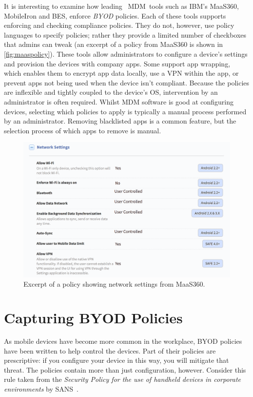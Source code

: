 \documentclass{llncs}
\begin{document}
It is interesting to examine how leading~\cite{rob_smith_magic_2016} MDM~tools such as IBM's MaaS360, MobileIron and \ac{BES}, enforce \emph{BYOD} policies.
Each of these tools supports enforcing and checking compliance policies. 
They do not, however, use policy languages to specify policies; rather they provide a limited number of checkboxes that admins can tweak (an excerpt of a policy from MaaS360 is shown in \autoref{fig:maaspolicy}).
These tools allow administrators to configure a device's settings and provision the devices with company apps.
Some support app wrapping, which enables them to encrypt app data locally, use a VPN within the app, or prevent apps not being used when the device isn't compliant.
Because the policies are inflexible and tightly coupled to the device's OS, intervention by an administrator is often required.
Whilst MDM software is good at configuring devices, selecting which policies to apply is typically a manual process performed by an administrator.
Removing blacklisted apps is a common feature, but the selection process of which apps to remove is manual.

\begin{figure}
  \includegraphics[width=\linewidth]{figures/maas360-policy.png}
  \caption{Excerpt of a policy showing network settings from MaaS360.}
  \label{fig:maaspolicy}
\end{figure}

\section{Capturing BYOD Policies}
\label{sec:idea}

As mobile devices have become more common in the workplace, BYOD policies have been written to help control the devices.
Part of their policies are prescriptive:  if you configure your device in this way, you will mitigate that threat.
The policies contain more than just configuration, however.
Consider this rule taken from the \emph{Security Policy for the use of handheld devices in corporate environments} by SANS~\cite{nicholas_r._c._guerin_security_2008}.
\end{document}
